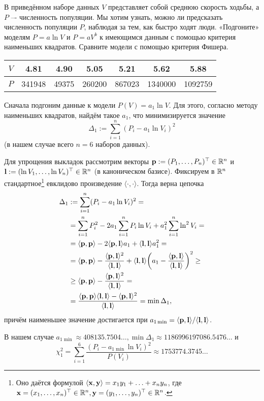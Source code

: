  В приведённом наборе данных $V$ представляет собой среднюю скорость ходьбы, а $P$ –- численность популяции. Мы хотим узнать, можно ли предсказать численность популяции $P$, наблюдая за тем, как быстро ходят люди. «Подгоните» моделям $P=a \ln V$ и $P=aV^b$ к имеющимся данным с помощью критерия наименьших квадратов. Сравните модели с помощью критерия Фишера.\par

\begin{center}
\begin{tabular}{ |c|c|c|c|c|c|c| }
\hline
$V$ & 4.81 & 4.90 & 5.05 & 5.21 & 5.62 & 5.88\\
\hline
$P$ & 341948 & 49375 & 260200 & 867023 & 1340000 & 1092759\\
\hline
\end{tabular}
\end{center}

Сначала подгоним данные к модели $P(V)=a_1\ln V$. Для этого, согласно методу наименьших квадратов, найдём такое $a_1$, что минимизируется значение
\[ \Delta _1 := \sum \limits_{i=1}^n (P_i - a_1 \ln V_i)^2 \]
(в нашем случае всего $n=6$ наборов данных).\par
Для упрощения выкладок рассмотрим векторы $\mathbf{p} := (P_1, \ldots, P_n)^\top \in \mathbb{R}^n$ и $\mathbf{l} := (\ln V_1, \ldots, \ln V_n)^\top \in \mathbb{R}^n$ (в каноническом базисе). Фиксируем в $\mathbb{R}^n$ стандартное\footnote{Оно даётся формулой $\langle \mathbf{x}, \mathbf{y} \rangle = x_1 y_1 + \ldots + x_n y_n$, где $\mathbf{x} = (x_1, \ldots, x_n)^\top \in \mathbb{R}^n, \mathbf{y} = (y_1, \ldots, y_n)^\top \in \mathbb{R}^n$.} евклидово произведение $\langle \cdot, \cdot \rangle$. Тогда верна цепочка
\begin{align*}
\Delta _1 & := \sum \limits_{i=1}^n (P_i - a_1 \ln V_i)^2 =\\
& = \sum \limits_{i=1}^n P_i^2 - 2a_1 \sum \limits_{i=1}^n P_i \ln V_i + a_1^2 \sum \limits_{i=1}^n \ln ^2 V_i =\\
& = \langle \mathbf{p}, \mathbf{p} \rangle - 2 \langle \mathbf{p}, \mathbf{l} \rangle a_1 + \langle \mathbf{l}, \mathbf{l} \rangle a_1^2 = \\
& = \langle \mathbf{p}, \mathbf{p} \rangle - \dfrac{\langle \mathbf{p}, \mathbf{l} \rangle^2}{\langle \mathbf{l}, \mathbf{l} \rangle} +
\langle \mathbf{l}, \mathbf{l} \rangle \bigg(  a_1 - \dfrac{\langle \mathbf{p}, \mathbf{l} \rangle}{\langle \mathbf{l}, \mathbf{l} \rangle} \bigg) ^2 \ge \\
& \ge \langle \mathbf{p}, \mathbf{p} \rangle - \dfrac{\langle \mathbf{p}, \mathbf{l} \rangle^2}{\langle \mathbf{l}, \mathbf{l} \rangle} =\\
& = \dfrac{\langle \mathbf{p}, \mathbf{p} \rangle\langle \mathbf{l}, \mathbf{l} \rangle - \langle \mathbf{p}, \mathbf{l} \rangle^2}{\langle \mathbf{l}, \mathbf{l} \rangle} = \min \Delta _1,
\end{align*}
причём наименьшее значение достигается при $a_{1\min}=\langle \mathbf{p}, \mathbf{l} \rangle / \langle \mathbf{l}, \mathbf{l} \rangle$.\par
В нашем случае $a_{1\min} \approx 408135.7504\ldots, \min \Delta _1 \approx 1186996197086.5476\ldots$ и 
\[ \chi _1^2 = \sum \limits _{i=1}^6 \dfrac{(P_i - a_{1 \min} \ln V_i)^2}{P(V_i)} \approx 1753774.3745\ldots \]

